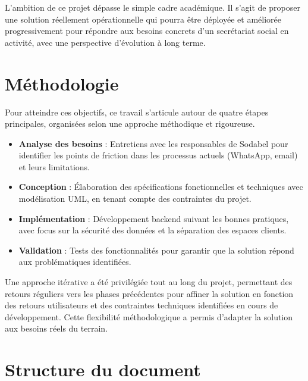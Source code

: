 \noindent L'ambition de ce projet dépasse le simple cadre académique. Il s'agit de proposer une solution réellement opérationnelle qui pourra être déployée et améliorée progressivement pour répondre aux besoins concrets d'un secrétariat social en activité, avec une perspective d'évolution à long terme.


\section*{Méthodologie}

\noindent Pour atteindre ces objectifs, ce travail s'articule autour de quatre étapes principales, organisées selon une approche méthodique et rigoureuse.

\begin{itemize}[leftmargin=*,label=\textcolor{darkgray}{$\bullet$},itemsep=0.3em]
  \item \textbf{Analyse des besoins} : Entretiens avec les responsables de Sodabel pour identifier les points de friction dans les processus actuels (WhatsApp, email) et leurs limitations.

  \item \textbf{Conception} : Élaboration des spécifications fonctionnelles et techniques avec modélisation UML, en tenant compte des contraintes du projet.

  \item \textbf{Implémentation} : Développement backend suivant les bonnes pratiques, avec focus sur la sécurité des données et la séparation des espaces clients.

  \item \textbf{Validation} : Tests des fonctionnalités pour garantir que la solution répond aux problématiques identifiées.
\end{itemize}

\begin{note}
Une approche itérative a été privilégiée tout au long du projet, permettant des retours réguliers vers les phases précédentes pour affiner la solution en fonction des retours utilisateurs et des contraintes techniques identifiées en cours de développement. Cette flexibilité méthodologique a permis d'adapter la solution aux besoins réels du terrain.
\end{note}

\section*{Structure du document}


